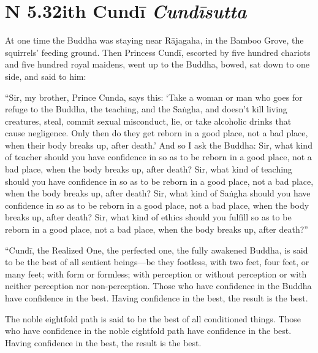 \documentclass[12pt,openany]{book}%
\newcommand*{\suttatitleacronym}[1]{\smaller[2]{#1}\vspace*{.3em}}
\newcommand*{\suttatitletranslation}[1]{\linebreak{#1}}
\newcommand*{\suttatitleroot}[1]{\linebreak\smaller[2]\itshape{#1}}
\newcommand*{\tocacronym}[1]{\hspace*{-3.3em}{#1}\quad}
\newcommand*{\toctranslation}[1]{#1}
\newcommand*{\tocroot}[1]{(\textit{#1})}
\begin{document}
%
\section*{{\suttatitleacronym AN 5.32}{\suttatitletranslation With Cundī }{\suttatitleroot Cundīsutta}}
\addcontentsline{toc}{section}{\tocacronym{AN 5.32} \toctranslation{With Cundī } \tocroot{Cundīsutta}}

At one time the Buddha was staying near \textsanskrit{Rājagaha}, in the Bamboo Grove, the squirrels’ feeding ground. Then Princess \textsanskrit{Cundī}, escorted by five hundred chariots and five hundred royal maidens, went up to the Buddha, bowed, sat down to one side, and said to him: 

“Sir, my brother, Prince Cunda, says this: ‘Take a woman or man who goes for refuge to the Buddha, the teaching, and the \textsanskrit{Saṅgha}, and doesn’t kill living creatures, steal, commit sexual misconduct, lie, or take alcoholic drinks that cause negligence. Only then do they get reborn in a good place, not a bad place, when their body breaks up, after death.’ And so I ask the Buddha: Sir, what kind of teacher should you have confidence in so as to be reborn in a good place, not a bad place, when the body breaks up, after death? Sir, what kind of teaching should you have confidence in so as to be reborn in a good place, not a bad place, when the body breaks up, after death? Sir, what kind of \textsanskrit{Saṅgha} should you have confidence in so as to be reborn in a good place, not a bad place, when the body breaks up, after death? Sir, what kind of ethics should you fulfill so as to be reborn in a good place, not a bad place, when the body breaks up, after death?” 

“\textsanskrit{Cundī}, the Realized One, the perfected one, the fully awakened Buddha, is said to be the best of all sentient beings—be they footless, with two feet, four feet, or many feet; with form or formless; with perception or without perception or with neither perception nor non-perception. Those who have confidence in the Buddha have confidence in the best. Having confidence in the best, the result is the best. 

The noble eightfold path is said to be the best of all conditioned things. Those who have confidence in the noble eightfold path have confidence in the best. Having confidence in the best, the result is the best. 
\end{document}
